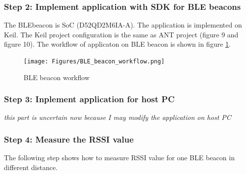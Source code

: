 \documentclass{article}
\begin{document}
\subsubsection{Step 2: Implement application with SDK for BLE beacons} 
The BLEbeacon is SoC (D52QD2M6IA-A). The application is implemented on Keil. The Keil project configuration is the same as ANT project (figure 9 and figure 10). The workflow of applicaton on BLE beacon is shown in figure \ref{BLE_beacon_workflow}.

\begin{figure}
\begin{center}
\caption{BLE beacon workflow}
\label{BLE_beacon_workflow}
\texttt{[image: Figures/BLE\_beacon\_workflow.png]}
\end{center}
\end{figure}

\subsubsection{Step 3: Inplement application for host PC} 
\textit{this part is uncertain now because I may modify the application on host PC }
\subsubsection{Step 4: Measure the RSSI value}

The following step shows how to measure RSSI value for one BLE beacon in different distance.
\end{document}
